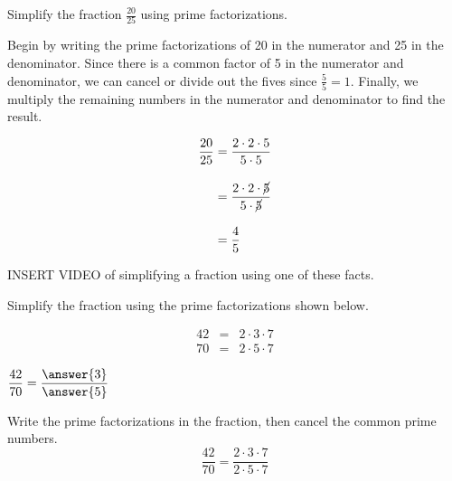 \documentclass{ximera}[font=12pt]  %
\begin{document}
\begin{example}
  
Simplify the fraction $\displaystyle \frac{20}{25}$ using prime factorizations.

\begin{explanation}

Begin by writing the prime factorizations of 20 in the numerator and 25 in the denominator.  Since there is a common 
factor of 5 in the numerator and denominator, we can cancel or divide out the fives since $\frac{5}{5}=1.$  Finally, we
multiply the remaining numbers in the numerator and denominator to find the result. 

\begin{align*}
\frac{20}{25} &= \frac{2 \cdot 2 \cdot 5}{5 \cdot 5} \\[1em]
              &= \frac{2 \cdot 2 \cdot \cancel{5}}{5 \cdot \cancel{5}} \\[1em]
              &= \frac{4}{5}
\end{align*}


\end{explanation}
\end{example}


INSERT VIDEO of simplifying a fraction using one of these facts.

\begin{problem}
Simplify the fraction using the prime factorizations shown below.

\begin{eqnarray*}
    42 &=& 2 \cdot 3 \cdot 7 \\
    70 &=& 2 \cdot 5 \cdot 7
\end{eqnarray*}

$\displaystyle \frac{42}{70} = \frac{\answer{3}}{\answer{5}}$

  \begin{hint}
    Write the prime factorizations in the fraction, then cancel the common prime numbers.
    \[ \frac{42}{70} = \frac{2 \cdot 3 \cdot 7}{2 \cdot 5 \cdot 7} \]
  \end{hint}

\end{problem}
\end{document}

